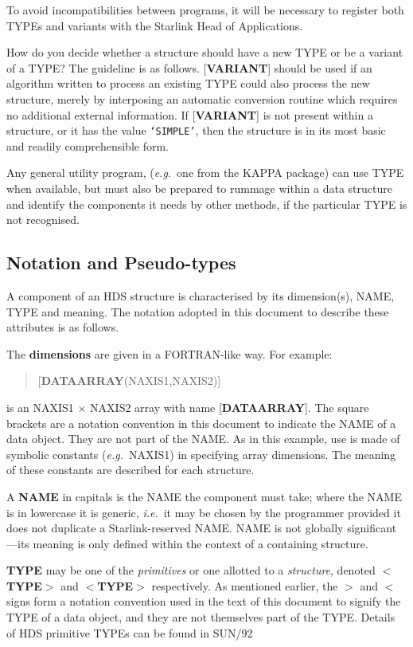 \documentclass[twoside,11pt]{article}
\newcommand{\xref}[3]{#1}
\newcommand{\xlabel}[1]{}
\renewcommand{\_}{\texttt{\symbol{95}}}
\begin{document}
To avoid incompatibilities between programs, it will be necessary to
register both TYPEs and variants with the Starlink Head of Applications.

How do you decide whether a structure should have
a new TYPE or be a variant of a TYPE?  The guideline is as
follows.  {[}{\bf VARIANT}{]} should be used
if an algorithm written to process an existing TYPE could also process
the new structure, merely by interposing an automatic conversion routine
which requires no additional external information.
If {[}{\bf VARIANT}{]} is not present within a structure,
or it has the value {\tt `SIMPLE'},
then the structure is in its most basic and readily
comprehensible form.

Any general utility program, ({\it e.g.}\  one from the
{\small KAPPA} package) can use TYPE
when available, but must also be prepared
to rummage within a data structure
and identify the components it needs by other methods, if the particular
TYPE is not recognised.

\subsection{\xlabel{se_notation}Notation and Pseudo-types\label{se:notation}}

A component of an HDS structure is characterised
by its dimension(s), NAME, TYPE and meaning.  The
notation adopted in this document to describe these
attributes is as follows.

The {\bf dimensions} are given in a FORTRAN-like way.
For example:
\begin{verse}
   {[}{\bf DATA\_ARRAY}(NAXIS1,NAXIS2){]}
\end{verse}
is an NAXIS1 $\times$ NAXIS2 array with name
{[}{\bf DATA\_ARRAY}{]}.
The square brackets are a notation convention
in this document to indicate the
NAME of a data object. They are not part of the NAME.
As in this example, use is made of symbolic constants ({\it e.g.}\  NAXIS1)
in specifying array dimensions.
The meaning of these constants are described for each structure.

A {\bf NAME} in capitals is the NAME the component must take; where the NAME
is in lowercase it is generic, {\it i.e.}\  it may be chosen by the
programmer provided it does not duplicate a Starlink-reserved NAME.
NAME is not globally significant---its meaning is only defined within
the context of a containing structure.

{\bf TYPE} may be one of the {\it primitives} or one
allotted to a {\it structure},
denoted $<${\bf \_TYPE}$>$ and
$<${\bf TYPE}$>$ respectively. As mentioned earlier, the $>$ and
$<$ signs form a notation convention used in the text of this
document to signify the TYPE of a data object, and they are not
themselves part of the TYPE. Details of
HDS primitive TYPEs can be found in \xref{SUN/92}{sun92}.
\end{document}
